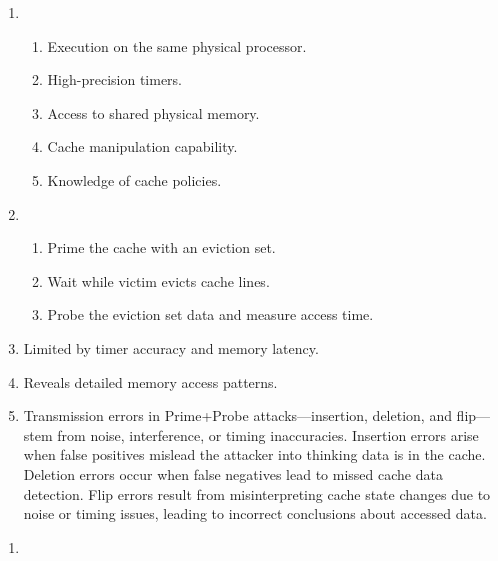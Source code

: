 \documentclass[sheet=2, prefix, english]{dexercise}
\begin{document}

\begin{enumerate}
  \item
    \begin{enumerate}
      \item Execution on the same physical processor.
      \item High-precision timers.
      \item Access to shared physical memory.
      \item Cache manipulation capability.
      \item Knowledge of cache policies.
    \end{enumerate}
  \item
    \begin{enumerate}
      \item Prime the cache with an eviction set.
      \item Wait while victim evicts cache lines.
      \item Probe the eviction set data and measure access time.
    \end{enumerate}
  \item Limited by timer accuracy and memory latency.
  \item Reveals detailed memory access patterns.
  \item
    Transmission errors in Prime+Probe attacks—insertion, deletion, and
    flip—stem from noise, interference, or timing inaccuracies.
    Insertion errors arise when false positives mislead the attacker into
    thinking data is in the cache.
    Deletion errors occur when false negatives lead to missed cache data
    detection.
    Flip errors result from misinterpreting cache state changes due to noise or
    timing issues, leading to incorrect conclusions about accessed data.
\end{enumerate}


\begin{enumerate}
  \item
\end{enumerate}
\end{document}
